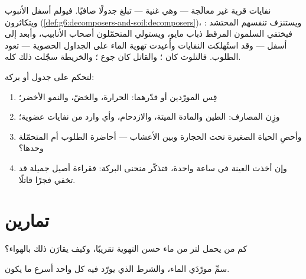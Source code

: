 \begin{example}\label{ex:g7:oxygen-in-the-water:waste}
نفايات قرية غير معالَجة --- وهي  غنية --- تبلغ جدولًا
صافيًا. فيولم  أسفل الأنبوب ويتكاثرون
(\cref{def:g6:decomposers-and-soil:decomposers})، ويستنزف تنفسهم
المحتشد : فيختفي السلمون المرقط  ذباب مايو، ويستولي
المتحمّلون أصحاب الأنابيب، وأبعد إلى أسفل --- وقد استُهلكت النفايات
وأُعيدت تهوية الماء على الجداول الحصوية --- تعود  الطلوب.
فالتلوث كان ؛ والقاتل كان جوع ؛ والخريطة سجّلت
ذلك كله.
\end{example}

\begin{method}\label{met:g7:oxygen-in-the-water:judge}
لتحكم على جدول أو بركة:
\begin{enumerate}
  \item قِس المورّدين أو قدّرهما: الحرارة، والخضّ، والنمو الأخضر؛
  \item وزِن المصارف: الطين والمادة الميتة، والازدحام، وأي وارد
        من نفايات عضوية؛
  \item وأحصِ الحياة الصغيرة تحت الحجارة وبين الأعشاب --- أحاضرة
         الطلوب أم المتحمّلة وحدها؟
  \item وإن أخذت العينة في ساعة واحدة، فتذكّر منحنى البركة:
        فقراءة أصيل جميلة قد تخفي فجرًا قاتلًا.
\end{enumerate}
\end{method}

\section{تمارين}

\begin{exercise}[$\star$]\label{exo:g7:oxygen-in-the-water:1}
كم من  يحمل لتر من ماء حسن التهوية تقريبًا، وكيف يقارَن
ذلك بالهواء؟
\end{exercise}

\begin{exercise}[$\star$]\label{exo:g7:oxygen-in-the-water:2}
سمِّ مورّدَي  الماء، والشرط الذي يورّد فيه كل واحد أسرع ما
يكون.
\end{exercise}

